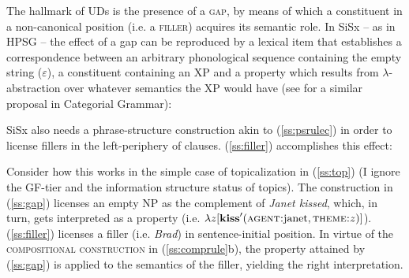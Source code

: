 \documentclass[output=paper,hidelinks]{langscibook}
\begin{document}
The hallmark of UDs is the presence of a \textsc{gap}, by means of which a constituent in a non-canonical position (i.e. a \textsc{filler}) acquires its semantic role.  In SiSx -- as in HPSG \citep[161]{pollard1994head-driven} -- the effect of a gap can be reproduced by a lexical item that establishes a correspondence between an arbitrary phonological sequence containing the empty string ($\varepsilon$), a constituent containing an XP and a property which results from  $\lambda$-abstraction over whatever semantics the XP would have (see \cite{muskens2003language} for a similar proposal in Categorial Grammar):




\begin{exe}
\label{ss:gap}
\end{exe}


SiSx also needs a phrase-structure construction akin to (\ref{ss:psrulec}) in order to license fillers in the left-periphery of clauses. (\ref{ss:filler}) accomplishes this effect:

\begin{exe}
 \label{ss:filler}
\end{exe}

Consider how this works in the simple case of topicalization in (\ref{ss:top}) (I ignore the GF-tier and the information structure status of topics). The construction in (\ref{ss:gap}) licenses an empty NP as the complement of \textit{Janet kissed}, which, in turn, gets interpreted as a property (i.e. $\lambda z[\textbf{kiss}'(\textsc{agent:}\text{janet}, \textsc{theme:}z)]$). (\ref{ss:filler}) licenses a filler (i.e. \textit{Brad}) in sentence-initial position. In virtue of the \textsc{compositional construction} in (\ref{ss:comprule}b), the property attained by (\ref{ss:gap}) is applied to the semantics of the filler, yielding the right interpretation.


\end{document}
